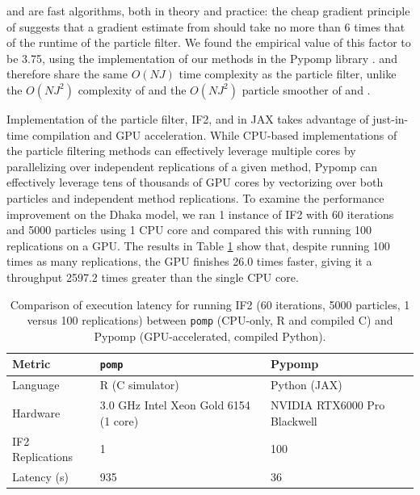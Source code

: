  and  are fast algorithms, both in theory and practice: the cheap gradient principle of \cite{kakade2019provably} suggests that a gradient estimate from  should take no more than 6 times that of the runtime of the particle filter.
We found the empirical value of this factor to be 3.75, using the implementation of our methods in the Pypomp library \citep{abkemeier25}.
 and  therefore share the same $O(NJ)$ time complexity as the particle filter, unlike the $O(NJ^2)$ complexity of \cite{corenflos21} and the $O(NJ^2)$ particle smoother of \citet{poyiadjis11} and \citet{scibior21}.

Implementation of the particle filter, IF2, and  in JAX \citep{jax} takes advantage of just-in-time compilation and GPU acceleration.
While CPU-based implementations of the particle filtering methods can effectively leverage multiple cores by parallelizing over independent replications of a given method, Pypomp can effectively leverage tens of thousands of GPU cores by vectorizing over both particles and independent method replications.
To examine the performance improvement on the Dhaka model, we ran 1 instance of IF2 with 60 iterations and 5000 particles using 1 CPU core and compared this with running 100 replications on a GPU.
The results in Table \ref{table:speedup} show that, despite running 100 times as many replications, the GPU finishes 26.0 times faster, giving it a throughput 2597.2 times greater than the single CPU core.

\begin{table}[htbp!]
\centering
\begin{tabular}{lll}
\toprule
Metric & \texttt{pomp} \citep{king16} & Pypomp \citep{abkemeier25} \\
\midrule
Language & R (C simulator) & Python (JAX) \\
Hardware& 3.0 GHz Intel Xeon Gold 6154 (1 core) & NVIDIA RTX6000 Pro Blackwell \\
IF2 Replications & 1 & 100 \\
Latency (s) & 935 & 36 \\
\bottomrule
\end{tabular}
\caption[Execution latency comparison between pomp (CPU) and Pypomp (GPU)]{Comparison of execution latency for running IF2 (60 iterations, 5000 particles, 1 versus 100 replications) between \texttt{pomp} (CPU-only, R and compiled C) and Pypomp (GPU-accelerated, compiled Python).}
\label{table:speedup}
\end{table}




